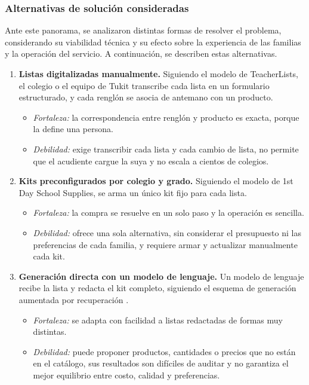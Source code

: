 \subsubsection{Alternativas de solución consideradas}

Ante este panorama, se analizaron distintas formas de resolver el problema, considerando su
viabilidad técnica y su efecto sobre la experiencia de las familias y la operación del
servicio. A continuación, se describen estas alternativas.\par

\begin{enumerate}
  \item \textbf{Listas digitalizadas manualmente.} Siguiendo el modelo de TeacherLists, el
        colegio o el equipo de Tukit transcribe cada lista en un formulario estructurado, y
        cada renglón se asocia de antemano con un producto.
        \begin{itemize}
          \item \textit{Fortaleza:} la correspondencia entre renglón y producto es exacta,
                porque la define una persona.
          \item \textit{Debilidad:} exige transcribir cada lista y cada cambio de lista, no
                permite que el acudiente cargue la suya y no escala a cientos de colegios.
        \end{itemize}

  \item \textbf{Kits preconfigurados por colegio y grado.} Siguiendo el modelo de 1st Day
        School Supplies, se arma un único kit fijo para cada lista.
        \begin{itemize}
          \item \textit{Fortaleza:} la compra se resuelve en un solo paso y la operación es
                sencilla.
          \item \textit{Debilidad:} ofrece una sola alternativa, sin considerar el
                presupuesto ni las preferencias de cada familia, y requiere armar y
                actualizar manualmente cada kit.
        \end{itemize}

  \item \textbf{Generación directa con un modelo de lenguaje.} Un modelo de lenguaje recibe
        la lista y redacta el kit completo, siguiendo el esquema de generación aumentada
        por recuperación \citep{lewis_retrieval-augmented_2020}.
        \begin{itemize}
          \item \textit{Fortaleza:} se adapta con facilidad a listas redactadas de formas
                muy distintas.
          \item \textit{Debilidad:} puede proponer productos, cantidades o precios que no
                están en el catálogo, sus resultados son difíciles de auditar y no garantiza
                el mejor equilibrio entre costo, calidad y preferencias.
        \end{itemize}


\end{enumerate}
